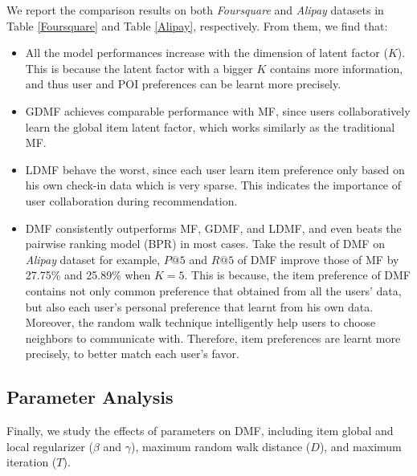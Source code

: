 We report the comparison results on both \emph{Foursquare} and \emph{Alipay} datasets in Table \ref{Foursquare} and Table \ref{Alipay}, respectively. 
From them, we find that:
\begin{itemize}[leftmargin=*] \setlength{\itemsep}{-\itemsep}
    \item All the model performances increase with the dimension of latent factor ($K$). 
	This is because the latent factor with a bigger $K$ contains more information, and thus user and POI preferences can be learnt more precisely. 
	\item GDMF achieves comparable performance with MF, since users collaboratively learn the global item latent factor, which works similarly as the traditional MF. 
	\item LDMF behave the worst, since each user learn item preference only based on his own check-in data which is very sparse. This indicates the importance of user collaboration during recommendation. 
    \item DMF consistently outperforms MF, GDMF, and LDMF, and even beats the pairwise ranking model (BPR) in most cases. 
    Take the result of DMF on \emph{Alipay} dataset for example, $P@5$ and $R@5$ of DMF improve those of MF by 27.75\% and 25.89\% when $K=5$. 
    This is because, the item preference of DMF contains not only common preference that obtained from all the users' data, but also each user's  personal preference that learnt from his own data. 
    Moreover, the random walk technique intelligently help users to choose neighbors to communicate with. 
    Therefore, item preferences are learnt more precisely, to better match each user's favor. 
\end{itemize}

\subsection{Parameter Analysis}
Finally, we study the effects of parameters on DMF, including item global and local regularizer ($\beta$ and $\gamma$), maximum random walk distance ($D$), and maximum iteration ($T$). 


